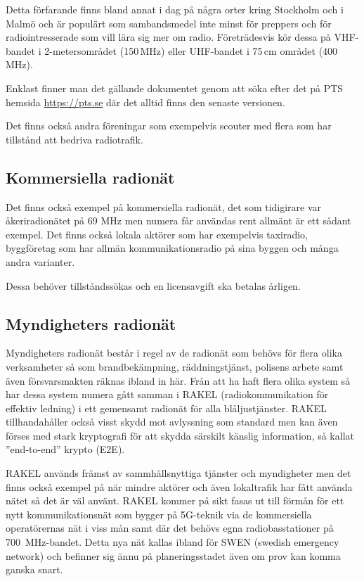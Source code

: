 Detta förfarande finns bland annat i dag på några orter kring Stockholm och i
Malmö och är populärt som sambandsmedel inte minst för preppers och för
radiointresserade som vill lära sig mer om radio. Företrädesvis kör dessa på
VHF-bandet i 2-metersområdet (150\,MHz) eller UHF-bandet i 75\,cm området
(400\,MHz).

Enklast finner man det gällande dokumentet genom att söka efter det på PTS
hemsida \url{https://pts.se} där det alltid finns den senaste versionen.

Det finns också andra föreningar som exempelvis scouter med flera som har
tillstånd att bedriva radiotrafik.

\subsection{Kommersiella radionät}

Det finns också exempel på kommersiella radionät, det som tidigirare var
åkeriradionätet på 69 MHz men numera får användas rent allmänt är ett sådant
exempel. Det finns också lokala aktörer som har exempelvis taxiradio,
byggföretag som har allmän kommunikationsradio på sina byggen och många andra
varianter.

Dessa behöver tillståndssökas och en licensavgift ska betalas årligen.

\subsection{Myndigheters radionät}

Myndigheters radionät består i regel av de radionät som behövs för flera olika
verksamheter så som brandbekämpning, räddningstjänst, polisens arbete samt
även försvarsmakten räknas ibland in här. Från att ha haft flera olika system
så har dessa system numera gått samman i RAKEL (radiokommunikation för
effektiv ledning) i ett gemensamt radionät för alla blåljustjänster. RAKEL
tillhandahåller också visst skydd mot avlyssning som standard men kan även
förses med stark kryptografi för att skydda särskilt känslig information, så
kallat ''end-to-end'' krypto (E2E).

RAKEL används främst av sammhällsnyttiga tjänster och myndigheter men det
finns också exempel på när mindre aktörer och även lokaltrafik har fått
använda nätet så det är väl använt. RAKEL kommer på sikt fasas ut till förmån
för ett nytt kommunikationsnät som bygger på 5G-teknik via de kommersiella
operatörernas nät i viss mån samt där det behövs egna radiobasstationer på
700~MHz-bandet. Detta nya nät kallas ibland för SWEN (swedish emergency
network) och befinner sig ännu på planeringsstadet även om prov kan komma
ganska snart.

